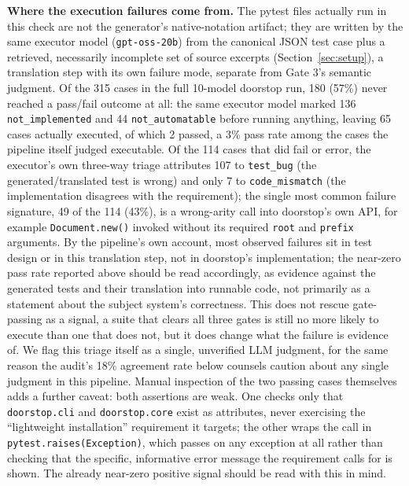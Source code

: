 \documentclass[conference]{IEEEtran}
\begin{document}
\textbf{Where the execution failures come from.} The pytest files actually run
in this check are not the generator's native-notation artifact; they are
written by the same executor model (\texttt{gpt-oss-20b}) from the canonical
JSON test case plus a retrieved, necessarily incomplete set of source
excerpts (Section~\ref{sec:setup}), a translation step with its own failure
mode, separate from Gate 3's semantic judgment. Of the 315 cases in the full
10-model doorstop run, 180 (57\%) never reached a pass/fail outcome at all:
the same executor model marked 136 \texttt{not\_implemented} and 44
\texttt{not\_automatable} before running anything, leaving 65 cases actually
executed, of which 2 passed, a 3\% pass rate among the cases the pipeline
itself judged executable. Of the 114 cases that did fail or error, the
executor's own three-way triage attributes 107 to \texttt{test\_bug} (the
generated/translated test is wrong) and only 7 to \texttt{code\_mismatch}
(the implementation disagrees with the requirement); the single most common
failure signature, 49 of the 114 (43\%), is a wrong-arity call into
doorstop's own API, for example \texttt{Document.new()} invoked without its
required \texttt{root} and \texttt{prefix} arguments. By the pipeline's own
account, most observed failures sit in test design or in this translation
step, not in doorstop's implementation; the near-zero pass rate reported
above should be read accordingly, as evidence against the generated tests
and their translation into runnable code, not primarily as a statement about
the subject system's correctness. This does not rescue gate-passing as a
signal, a suite that clears all three gates is still no more likely to
execute than one that does not, but it does change what the failure is
evidence of. We flag this triage itself as a single, unverified LLM
judgment, for the same reason the audit's 18\% agreement rate below counsels
caution about any single judgment in this pipeline. Manual inspection of the
two passing cases themselves adds a further caveat: both assertions are weak.
One checks only that \texttt{doorstop.cli} and \texttt{doorstop.core} exist as
attributes, never exercising the ``lightweight installation'' requirement it
targets; the other wraps the call in \texttt{pytest.raises(Exception)}, which
passes on any exception at all rather than checking that the specific,
informative error message the requirement calls for is shown. The already
near-zero positive signal should be read with this in mind.
\end{document}
